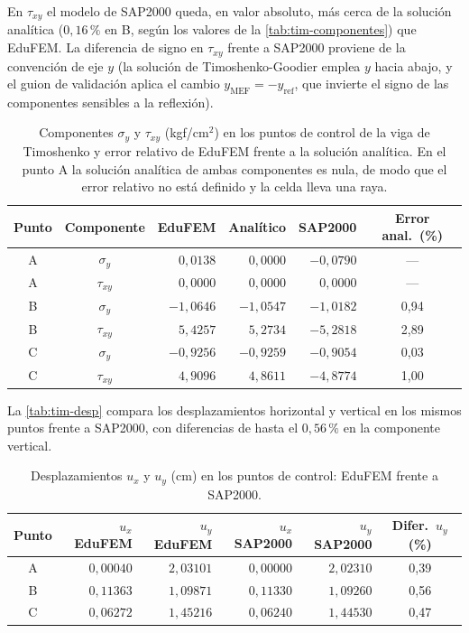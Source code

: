 En $\tau_{xy}$ el modelo de SAP2000 queda, en valor absoluto, más cerca de la solución analítica ($0{,}16\,\%$ en B, según los valores de la \autoref{tab:tim-componentes}) que EduFEM. La diferencia de signo en $\tau_{xy}$ frente a SAP2000 proviene de la convención de eje $y$ (la solución de Timoshenko-Goodier emplea $y$ hacia abajo, y el guion de validación aplica el cambio $y_{\text{MEF}} = -y_{\text{ref}}$, que invierte el signo de las componentes sensibles a la reflexión).

\begin{table}[htbp]
\centering
\caption[Componentes $\sigma_y$ y $\tau_{xy}$ en los puntos de control de la viga de Timoshenko.]{Componentes $\sigma_y$ y $\tau_{xy}$ (kgf/cm$^2$) en los puntos de control de la viga de Timoshenko y error relativo de EduFEM frente a la solución analítica. En el punto A la solución analítica de ambas componentes es nula, de modo que el error relativo no está definido y la celda lleva una raya.}
\label{tab:tim-componentes}
\begin{tabular}{c c r r r c}
\hline
Punto & Componente & EduFEM & Analítico & SAP2000 & Error anal.\ (\%) \\
\hline
A & $\sigma_y$  & $0{,}0138$  & $0{,}0000$  & $-0{,}0790$ & --- \\
A & $\tau_{xy}$ & $0{,}0000$  & $0{,}0000$  & $0{,}0000$  & --- \\
B & $\sigma_y$  & $-1{,}0646$ & $-1{,}0547$ & $-1{,}0182$ & 0,94 \\
B & $\tau_{xy}$ & $5{,}4257$  & $5{,}2734$  & $-5{,}2818$ & 2,89 \\
C & $\sigma_y$  & $-0{,}9256$ & $-0{,}9259$ & $-0{,}9054$ & 0,03 \\
C & $\tau_{xy}$ & $4{,}9096$  & $4{,}8611$  & $-4{,}8774$ & 1,00 \\
\hline
\end{tabular}
\end{table}

La \autoref{tab:tim-desp} compara los desplazamientos horizontal y vertical en los mismos puntos frente a SAP2000, con diferencias de hasta el $0{,}56\,\%$ en la componente vertical.

\begin{table}[htbp]
\centering
\caption{Desplazamientos $u_x$ y $u_y$ (cm) en los puntos de control: EduFEM frente a SAP2000.}
\label{tab:tim-desp}
\begin{tabular}{c r r r r c}
\hline
Punto & $u_x$ EduFEM & $u_y$ EduFEM & $u_x$ SAP2000 & $u_y$ SAP2000 & Difer.\ $u_y$ (\%) \\
\hline
A & $0{,}00040$ & $2{,}03101$ & $0{,}00000$ & $2{,}02310$ & 0,39 \\
B & $0{,}11363$ & $1{,}09871$ & $0{,}11330$ & $1{,}09260$ & 0,56 \\
C & $0{,}06272$ & $1{,}45216$ & $0{,}06240$ & $1{,}44530$ & 0,47 \\
\hline
\end{tabular}
\end{table}

